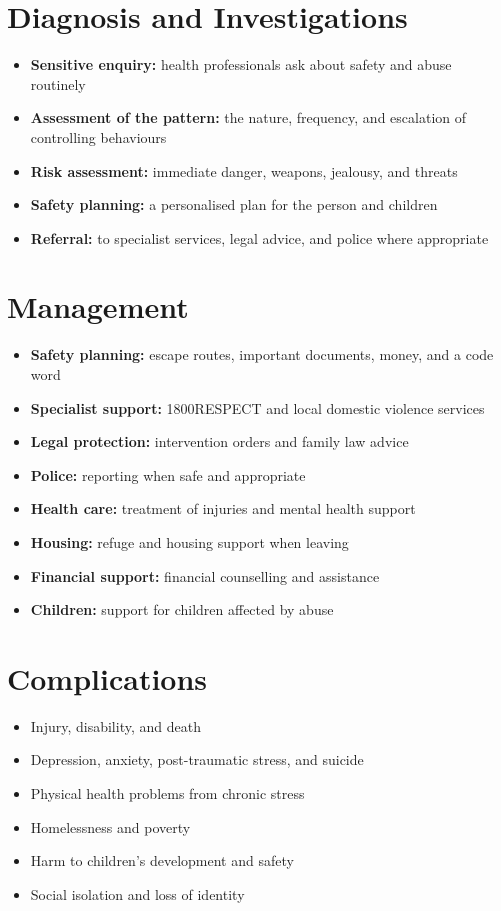 \section*{Diagnosis and Investigations}
\begin{itemize}
    \item \textbf{Sensitive enquiry:} health professionals ask about safety and abuse routinely
    \item \textbf{Assessment of the pattern:} the nature, frequency, and escalation of controlling behaviours
    \item \textbf{Risk assessment:} immediate danger, weapons, jealousy, and threats
    \item \textbf{Safety planning:} a personalised plan for the person and children
    \item \textbf{Referral:} to specialist services, legal advice, and police where appropriate
\end{itemize}

\section*{Management}
\begin{itemize}
    \item \textbf{Safety planning:} escape routes, important documents, money, and a code word
    \item \textbf{Specialist support:} 1800RESPECT and local domestic violence services
    \item \textbf{Legal protection:} intervention orders and family law advice
    \item \textbf{Police:} reporting when safe and appropriate
    \item \textbf{Health care:} treatment of injuries and mental health support
    \item \textbf{Housing:} refuge and housing support when leaving
    \item \textbf{Financial support:} financial counselling and assistance
    \item \textbf{Children:} support for children affected by abuse
\end{itemize}

\section*{Complications}
\begin{itemize}
    \item Injury, disability, and death
    \item Depression, anxiety, post-traumatic stress, and suicide
    \item Physical health problems from chronic stress
    \item Homelessness and poverty
    \item Harm to children's development and safety
    \item Social isolation and loss of identity
\end{itemize}

